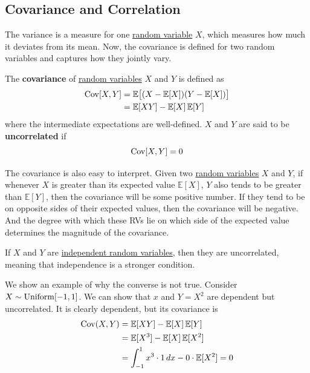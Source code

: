 \subsection{Covariance and Correlation}

  The variance is a measure for one \hyperref[def:random-variable]{random variable} $X$, which measures how much it deviates from its mean. Now, the covariance is defined for two random variables and captures how they jointly vary. 

  \begin{definition}[Covariance]
    \label{def:covariance}
    The \textbf{covariance} of \hyperref[def:random-variable]{random variables} $X$ and $Y$ is defined as 
    \begin{align*}
      \operatorname{Cov}[X, Y] & = \mathbb{E} \big[ (X - \mathbb{E}[X]) (Y - \mathbb{E}[X]) \big] \\
      & = \mathbb{E}[X Y] - \mathbb{E}[X] \, \mathbb{E}[Y]
    \end{align*}
    where the intermediate expectations are well-defined. $X$ and $Y$ are said to be \textbf{uncorrelated} if 
    \begin{equation}
      \operatorname{Cov}[X, Y] = 0
    \end{equation}
  \end{definition}

  The covariance is also easy to interpret. Given two \hyperref[def:random-variable]{random variables} $X$ and $Y$, if whenever $X$ is greater than its expected value $\mathbb{E}[X]$, $Y$ also tends to be greater than $\mathbb{E}[Y]$, then the covariance will be some positive number. If they tend to be on opposite sides of their expected values, then the covariance will be negative. And the degree with which these RVs lie on which side of the expected value determines the magnitude of the covariance. 

  \begin{theorem}
    \label{thm:independence-implies-uncorrelatedness}
    If $X$ and $Y$ are \hyperref[def:independent-random-variables]{independent random variables}, then they are uncorrelated, meaning that independence is a stronger condition. 
  \end{theorem}

  We show an example of why the converse is not true. Consider $X \sim \operatorname{Uniform}[-1, 1]$. We can show that $x$ and $Y = X^2$ are dependent but uncorrelated. It is clearly dependent, but its covariance is 
  \begin{align*}
    \operatorname{Cov}(X, Y) & = \mathbb{E}[X Y] - \mathbb{E}[X] \, \mathbb{E}[Y] \\
    & = \mathbb{E}[X^3] - \mathbb{E}[X] \, \mathbb{E}[X^2] \\
    & = \int_{-1}^1 x^3 \cdot 1 \,dx - 0 \cdot \mathbb{E}[X^2] = 0
  \end{align*}

